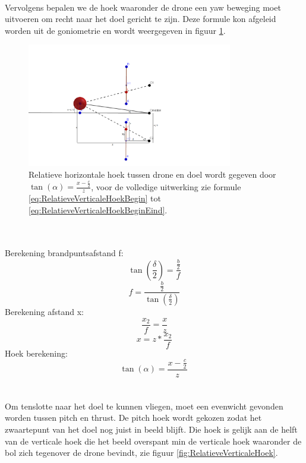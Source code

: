 \\
Vervolgens bepalen we de hoek waaronder de drone een yaw beweging moet uitvoeren om recht naar het doel gericht te zijn. Deze formule kon afgeleid worden uit de goniometrie en wordt weergegeven in figuur \ref{fig:RelatieveHorizontaleHoek}. 
\begin{figure}[h]
	\centering
	\includegraphics[width=0.8\textwidth]{RelatieveHorizontaleHoek.png}
	\caption{Relatieve horizontale hoek tussen drone en doel wordt gegeven door \(\tan(\alpha) = \frac{x-\frac{c}{2}}{z}\), voor de volledige uitwerking zie formule \ref{eq:RelatieveVerticaleHoekBegin} tot \ref{eq:RelatieveVerticaleHoekBeginEind}.}
	\label{fig:RelatieveHorizontaleHoek}
\end{figure}
\\
\\
Berekening brandpuntsafstand f:
\begin{equation}[h] \label{eq:RelatieveVerticaleHoekBegin}
\tan(\frac{\delta}{2}) = \frac{\frac{b}{2}}{f}
\end{equation}
\begin{equation}[h] 
f = \frac{\frac{b}{2}}{\tan(\frac{\delta}{2})}
\end{equation}
Berekening afstand x:
\begin{equation}[h] 
\frac{x_2}{f} = \frac{x}{z}
\end{equation}
\begin{equation}[h]
x = z * \frac{x_2}{f}	
\end{equation}
Hoek berekening:
\begin{equation}[h] \label{eq:RelatieveVerticaleHoekBeginEind}
\tan(\alpha) = \frac{x-\frac{c}{2}}{z}\	
\end{equation}
\\
\\
Om tenslotte naar het doel te kunnen vliegen, moet een evenwicht gevonden worden tussen pitch en thrust. De pitch hoek wordt gekozen zodat het zwaartepunt van het doel nog juist in beeld blijft. Die hoek is gelijk aan de helft van de verticale hoek die het beeld overspant min de verticale hoek waaronder de bol zich tegenover de drone bevindt, zie figuur \ref{fig:RelatieveVerticaleHoek}. 
